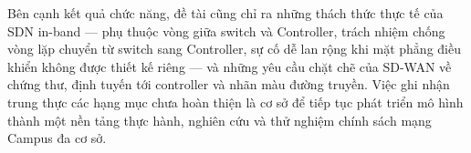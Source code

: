Bên cạnh kết quả chức năng, đề tài cũng chỉ ra những thách thức thực tế của SDN in-band --- phụ thuộc vòng giữa switch và Controller, trách nhiệm chống vòng lặp chuyển từ switch sang Controller, sự cố dễ lan rộng khi mặt phẳng điều khiển không được thiết kế riêng --- và những yêu cầu chặt chẽ của SD-WAN về chứng thư, định tuyến tới controller và nhãn màu đường truyền. Việc ghi nhận trung thực các hạng mục chưa hoàn thiện là cơ sở để tiếp tục phát triển mô hình thành một nền tảng thực hành, nghiên cứu và thử nghiệm chính sách mạng Campus đa cơ sở.
